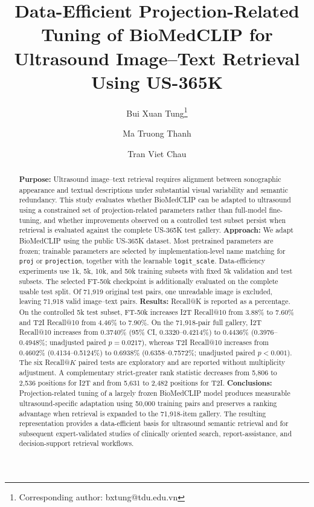 \documentclass[runningheads]{llncs}
\begin{document}
\title{Data-Efficient Projection-Related Tuning of BioMedCLIP for Ultrasound Image--Text Retrieval Using US-365K}
\author{Bui Xuan Tung\thanks{Corresponding author: bxtung@tdu.edu.vn} \and Ma Truong Thanh \and Tran Viet Chau}
\maketitle
\begin{abstract}
\textbf{Purpose:} Ultrasound image--text retrieval requires alignment between sonographic appearance and textual descriptions under substantial visual variability and semantic redundancy. This study evaluates whether BioMedCLIP can be adapted to ultrasound using a constrained set of projection-related parameters rather than full-model fine-tuning, and whether improvements observed on a controlled test subset persist when retrieval is evaluated against the complete US-365K test gallery. \textbf{Approach:} We adapt BioMedCLIP using the public US-365K dataset. Most pretrained parameters are frozen; trainable parameters are selected by implementation-level name matching for \texttt{proj} or \texttt{projection}, together with the learnable \texttt{logit\_scale}. Data-efficiency experiments use 1k, 5k, 10k, and 50k training subsets with fixed 5k validation and test subsets. The selected FT-50k checkpoint is additionally evaluated on the complete usable test split. Of 71,919 original test pairs, one unreadable image is excluded, leaving 71,918 valid image--text pairs. \textbf{Results:} Recall@K is reported as a percentage. On the controlled 5k test subset, FT-50k increases I2T Recall@10 from 3.88\% to 7.60\% and T2I Recall@10 from 4.46\% to 7.90\%. On the 71,918-pair full gallery, I2T Recall@10 increases from 0.3740\% (95\% CI, 0.3320--0.4214\%) to 0.4436\% (0.3976--0.4948\%; unadjusted paired $p=0.0217$), whereas T2I Recall@10 increases from 0.4602\% (0.4134--0.5124\%) to 0.6938\% (0.6358--0.7572\%; unadjusted paired $p<0.001$). The six Recall@$K$ paired tests are exploratory and are reported without multiplicity adjustment. A complementary strict-greater rank statistic decreases from 5,806 to 2,536 positions for I2T and from 5,631 to 2,482 positions for T2I. \textbf{Conclusions:} Projection-related tuning of a largely frozen BioMedCLIP model produces measurable ultrasound-specific adaptation using 50,000 training pairs and preserves a ranking advantage when retrieval is expanded to the 71,918-item gallery. The resulting representation provides a data-efficient basis for ultrasound semantic retrieval and for subsequent expert-validated studies of clinically oriented search, report-assistance, and decision-support retrieval workflows.
\end{abstract}
\end{document}
